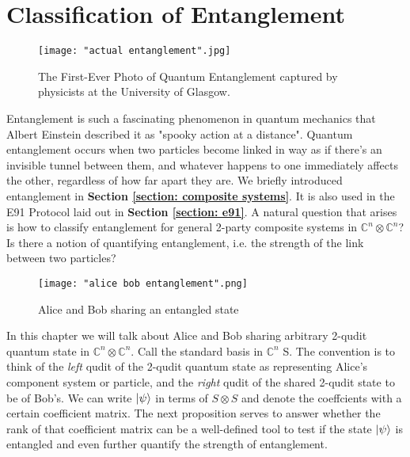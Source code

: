 
\chapter{Classification of Entanglement} %

\label{Chapter6-classification of entanglement} %
\begin{figure}[h]
    \centering
    \texttt{[image: "actual entanglement".jpg]}
    \caption{The First-Ever Photo of Quantum Entanglement captured by physicists at the University of Glasgow. \cite{moreau2019imaging}}
    \label{fig:actual entanglemen}
\end{figure}

Entanglement is such a fascinating phenomenon in quantum mechanics that Albert Einstein described it as "spooky action at a distance". Quantum entanglement occurs when two particles become linked in way as if there's an invisible tunnel between them, and whatever happens to one immediately affects the other, regardless of how far apart they are. We briefly introduced entanglement in \textbf{Section \ref{section: composite systems}}. It is also used in the E91 Protocol laid out in \textbf{Section \ref{section: e91}}. A natural question that arises is how to classify entanglement for general 2-party composite systems in $\mathbb{C}^n \otimes \mathbb{C}^n$? Is there a notion of quantifying entanglement, i.e. the strength of the link between two particles?


\begin{figure}[h]
    \centering
    \texttt{[image: "alice bob entanglement".png]}
    \caption{Alice and Bob sharing an entangled state}
    \label{fig:entanglement}
\end{figure}

In this chapter we will talk about Alice and Bob sharing arbitrary 2-qudit quantum state in $\mathbb{C}^n \otimes \mathbb{C}^n$. Call the standard basis in $\mathbb{C}^n$ S. The convention is to think of the \textit{left} qudit of the 2-qudit quantum state as representing Alice's component system or particle, and the \textit{right} qudit of the shared 2-qudit state to be of Bob's. We can write $\ket{\psi}$ in terms of $S \otimes S$ and denote the coeffcients with a certain coefficient matrix. The next proposition serves to answer whether the rank of that coefficient matrix can be a well-defined tool to test if the state $\ket{\psi}$ is entangled and even further quantify the strength of entanglement.

